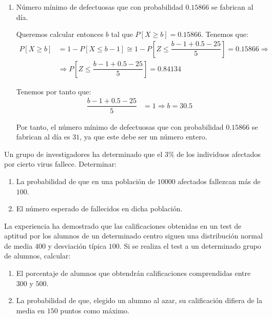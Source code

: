 \begin{ejercicio}
\begin{enumerate}
        \item Número mínimo de defectuosas que con probabilidad $0.15866$ se fabrican al día.
        
        Queremos calcular entonces $b$ tal que $P[X\geq b] = 0.15866$. Tenemos que:
        \begin{align*}
            P[X\geq b] &= 1-P[X\leq b-1] \cong 1-P\left[Z\leq \dfrac{b-1+0.5-25}{5}\right] = 0.15866
            \Longrightarrow \\
            & \Longrightarrow
            P\left[Z\leq \dfrac{b-1+0.5-25}{5}\right] = 0.84134
        \end{align*}

        Tenemos por tanto que:
        \begin{align*}
            \dfrac{b-1+0.5-25}{5} &= 1 \Longrightarrow b = 30.5
        \end{align*}

        Por tanto, el número mínimo de defectuosas que con probabilidad $0.15866$ se fabrican al día es $31$, ya que este debe ser un número entero.
    \end{enumerate}
\end{ejercicio}

\begin{ejercicio}
    Un grupo de investigadores ha determinado que el $3\%$ de los individuos afectados por cierto virus fallece. Determinar:
    \begin{enumerate}
        \item La probabilidad de que en una población de $10000$ afectados fallezcan más de $100$.
        \item El número esperado de fallecidos en dicha población.
    \end{enumerate}
\end{ejercicio}

\begin{ejercicio}
    La experiencia ha demostrado que las calificaciones obtenidas en un test de aptitud por los alumnos de un determinado centro siguen una distribución normal de media $400$ y desviación típica $100$. Si se realiza el test a un determinado grupo de alumnos, calcular:
    \begin{enumerate}
        \item El porcentaje de alumnos que obtendrán calificaciones comprendidas entre $300$ y $500$.
        \item La probabilidad de que, elegido un alumno al azar, su calificación difiera de la media en $150$ puntos como máximo.
    \end{enumerate}
\end{ejercicio}

